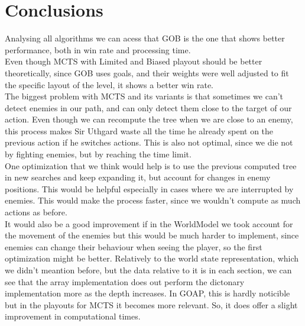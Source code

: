 \documentclass{article}
\begin{document}
  \section{Conclusions}
  Analysing all algorithms we can acess that GOB is the one that shows better performance, both in win rate and processing time.\\
  Even though MCTS with Limited and Biased playout should be better theoretically, since GOB uses goals, and their weights were well adjusted to fit the 
  specific layout of the level, it shows a better win rate.\\
  The biggest problem with MCTS and its variants is that sometimes we can't detect enemies in our path, and can only detect them close to the target of our action.
  Even though we can recompute the tree when we are close to an enemy, this process makes Sir Uthgard waste all the time he already spent on the previous action if he switches
  actions. This is also not optimal, since we die not by fighting enemies, but by reaching the time limit.\\
  One optimization that we think would help is to use the previous computed tree in new searches and keep expanding it, but account for changes in enemy positions. This would be 
  helpful especially in cases where we are interrupted by enemies. 
  This would make the process faster, since we wouldn't compute as much actions as before.\\
  It would also be a good improvement if in the WorldModel we took account for the movement of the enemies but this would be much harder to implement, since enemies can
  change their behaviour when seeing the player, so the first optimization might be better.
  Relatively to the world state representation, which we didn't meantion before, but the data relative to it is in each section, we can see that the array implementation does out perform the dictonary implementation more as the depth increases. In GOAP, this is hardly noticible but in the playouts for MCTS it becomes more relevant. So, it does offer a slight improvement in computational times.
\end{document}
